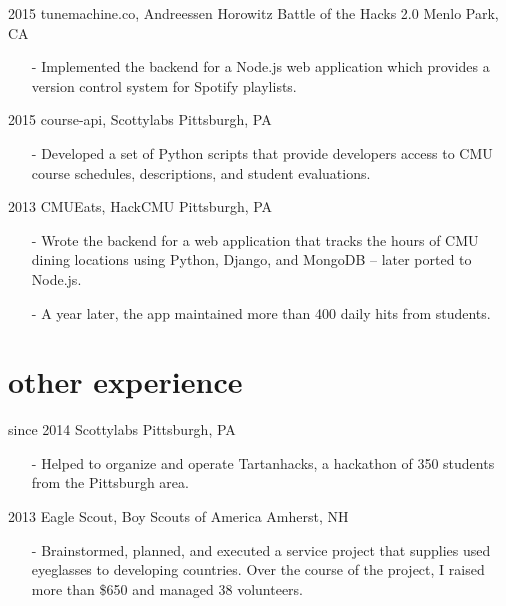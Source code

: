 \documentclass[]{friggeri-cv}
\begin{document}
    \begin{entrylist}
        \entrys
            {2015}
            {tunemachine.co, {\normalfont Andreessen Horowitz Battle of the Hacks 2.0}}
            {Menlo Park, CA}
            {\begin{itemize}[leftmargin=*]
                \item[-] Implemented the backend for a Node.js web application which provides a version control system for Spotify playlists.
            \end{itemize}}
        \entrys
            {2015}
            {course-api, {\normalfont Scottylabs}}
            {Pittsburgh, PA}
            {\begin{itemize}[leftmargin=*]
                \item[-] Developed a set of Python scripts that provide developers access to CMU course schedules, descriptions, and student evaluations.
            \end{itemize}}
        \entrys
            {2013}
            {CMUEats, {\normalfont HackCMU}}
            {Pittsburgh, PA}
            {\begin{itemize}[leftmargin=*]
                \item[-] Wrote the backend for a web application that tracks the hours of CMU dining locations using Python, Django, and MongoDB -- later ported to Node.js.
                \item[-] A year later, the app maintained more than 400 daily hits from students.
            \end{itemize}}
    \end{entrylist}

    \section{other experience}

    \begin{entrylist}
        \entrys
            {since 2014}
            {Scottylabs}
            {Pittsburgh, PA}
            {\begin{itemize}[leftmargin=*]
                \item[-] Helped to organize and operate Tartanhacks, a hackathon of 350 students from the Pittsburgh area.
            \end{itemize}}
        \entrys
            {2013}
            {Eagle Scout, {\normalfont Boy Scouts of America}}
            {Amherst, NH}
            {\begin{itemize}[leftmargin=*]
                \item[-] Brainstormed, planned, and executed a service project that supplies used eyeglasses to developing countries. Over the course of the project, I raised more than \$650 and managed 38 volunteers.
            \end{itemize}}
    \end{entrylist}
\end{document}
